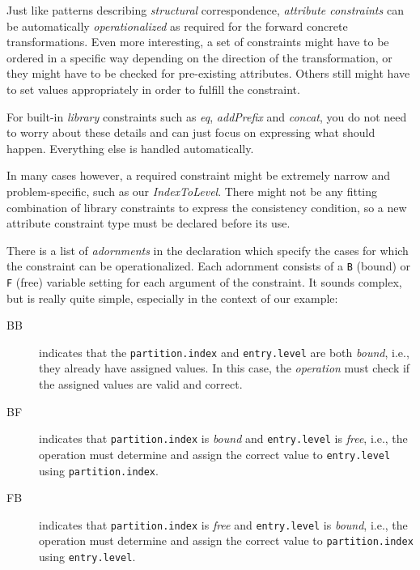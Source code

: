 \newpage

Just like patterns describing \emph{structural} correspondence, \emph{attribute constraints} can be automatically \emph{operationalized} as required for the
forward concrete transformations. Even more interesting, a set of constraints might have to be ordered in a specific way depending on the direction of the
transformation, or they might have to be checked for pre-existing attributes. Others still might have to set values appropriately in order to fulfill the
constraint.

For built-in \emph{library} constraints such as \emph{eq}, \emph{addPrefix} and \emph{concat}, you do not need to worry about these details and can just focus
on expressing what should happen. Everything else is handled automatically.

In many cases however, a required constraint might be extremely narrow and problem-specific, such as our \emph{IndexToLevel}. There might not be any fitting
combination of library constraints to express the consistency condition, so a new attribute constraint type must be declared before its use.

There is a list of \emph{adornments} in the declaration which specify the cases for which the constraint can be operationalized. Each adornment consists of a
\texttt{B} (bound) or \texttt{F} (free) variable setting for each argument of the constraint. It sounds complex, but is really quite simple, especially in the
context of our example:

\begin{description}

\item[BB] indicates that the \texttt{partition.index} and \texttt{entry.level} are both \emph{bound}, i.e., they already have assigned values.
In this case, the \emph{operation} must check if the assigned values are valid and correct.

\item[BF] indicates that \texttt{partition.index} is \emph{bound} and \texttt{entry.level} is \emph{free}, i.e., the operation must determine and assign the
correct value to \texttt{entry.level} using \texttt{partition.index}.

\item[FB] indicates that \texttt{partition.index} is \emph{free} and \texttt{entry.level} is \emph{bound}, i.e., the operation must determine and assign the
correct value to \texttt{parti\-tion.in\-dex} using \texttt{entry.level}.

\end{description}


